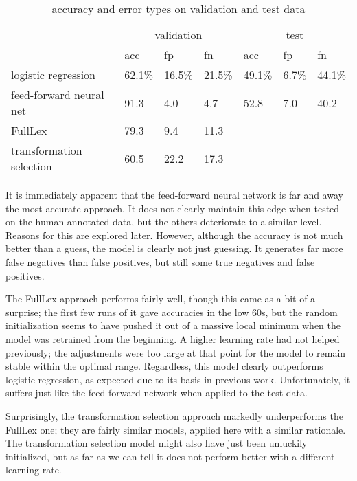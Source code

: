 \documentclass[a4paper, 11pt]{scrartcl}
\begin{document}
\begin{table}[]
	\centering
	\begin{tabular}{l|lll|lll}
		                         & \multicolumn{3}{c|}{validation} & \multicolumn{3}{c}{test}  \\
		                         & acc      & fp       & fn        & acc     & fp     & fn     \\ \hline
		logistic regression      & 62.1\%   & 16.5\%   & 21.5\%    & 49.1\%  & 6.7\%  & 44.1\% \\
		feed-forward neural net  & 91.3     & 4.0      & 4.7       & 52.8    & 7.0    & 40.2   \\
		FullLex                  & 79.3     & 9.4      & 11.3      &         &        &        \\
		transformation selection & 60.5     & 22.2     & 17.3      &         &        &      
	\end{tabular}
	\caption{accuracy and error types on validation and test data}
	\label{accuracy-an}
\end{table}

It is immediately apparent that the feed-forward neural network is far and away the most accurate approach. It does not clearly maintain this edge when tested on the human-annotated data, but the others deteriorate to a similar level. Reasons for this are explored later. However, although the accuracy is not much better than a guess, the model is clearly not just guessing. It generates far more false negatives than false positives, but still some true negatives and false positives.

The FullLex approach performs fairly well, though this came as a bit of a surprise; the first few runs of it gave accuracies in the low 60s, but the random initialization seems to have pushed it out of a massive local minimum when the model was retrained from the beginning. A higher learning rate had not helped previously; the adjustments were too large at that point for the model to remain stable within the optimal range. Regardless, this model clearly outperforms logistic regression, as expected due to its basis in previous work. Unfortunately, it suffers just like the feed-forward network when applied to the test data.

Surprisingly, the transformation selection approach markedly underperforms the FullLex one; they are fairly similar models, applied here with a similar rationale. The transformation selection model might also have just been unluckily initialized, but as far as we can tell it does not perform better with a different learning rate.
\end{document}

